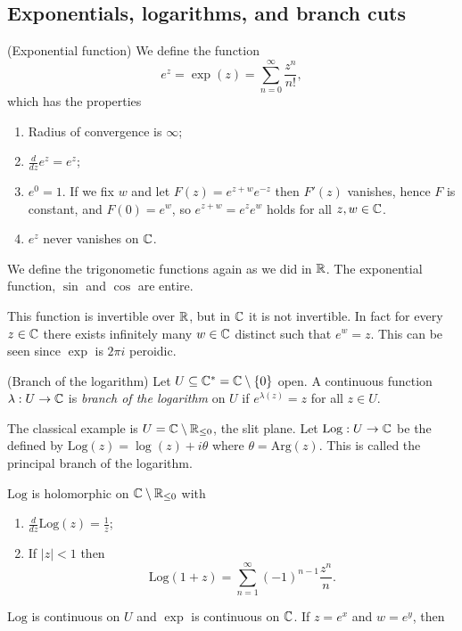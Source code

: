 \documentclass{article}
\newcommand{\Arg}{\mathrm{Arg}}
\newcommand{\Log}{\mathrm{Log}}
\begin{document}
\subsection{Exponentials, logarithms, and branch cuts}
\begin{definition}
	(Exponential function) We define the function
	\[
		e^z = \exp(z) = \sum_{n=0}^\infty \frac{z^n}{n!},
	\]
	which has the properties
	\begin{enumerate}
		\item Radius of convergence is $ \infty $;
		\item $ \frac d{dz} e^z = e^z $;
		\item $ e^0 =1 $. If we fix $ w $ and let $ F(z) = e^{z+w}e^{-z} $ then $ F'(z) $ vanishes, hence $ F $ is constant, and $ F(0) = e^w $, so $ e^{z+w} = e^ze^w $ holds for all $ z,w\in \mathbb{C} $.
		\item $ e^z $ never vanishes on $ \mathbb{C} $.
	\end{enumerate}
\end{definition}
\begin{remark}
  We define the trigonometic functions again as we did in $ \mathbb{R} $. The exponential function, $ \sin $ and $ \cos $ are entire.
\end{remark}
This function is invertible over $ \mathbb{R} $, but in $ \mathbb{C} $ it is not invertible. In fact for every $ z\in \mathbb{C} $ there exists infinitely many $ w\in \mathbb{C} $ distinct such that $ e^w = z $. This can be seen since $ \exp $ is $ 2\pi i $ peroidic.
\begin{definition}
	(Branch of the logarithm) Let $ U\subseteq \mathbb{C}^* = \mathbb{C} \setminus \{0\} $ open. A continuous function $ \lambda: U\to \mathbb{C} $ is \textit{branch of the logarithm} on $ U $ if $ e^{\lambda(z)} = z $ for all $ z\in U $.
\end{definition}
The classical example is $ U = \mathbb{C} \setminus \mathbb{R}_{\le 0} $, the slit plane. Let $ \Log: U \to \C $ be the defined by $ \Log(z) = \log(z) + i\theta $ where $ \theta= \Arg(z) $. This is called the principal branch of the logarithm.
\begin{proposition}
	$ \Log $ is holomorphic on $ \mathbb{C}\setminus \mathbb{R}_{\le 0} $ with
	\begin{enumerate}
		\item  $ \frac{d}{dz}\Log(z) = \frac 1z $;
		\item If $ |z|<1 $ then
			\[
				\Log(1+z) = \sum_{n=1}^\infty (-1)^{n-1}\frac {z^n}n.
			\]
	\end{enumerate}
\end{proposition}
\pf $ \Log $ is continuous on $ U $ and $ \exp $ is continuous on $ \mathbb{C} $. If $ z= e^x $ and $ w=e^y $, then
\end{document}
